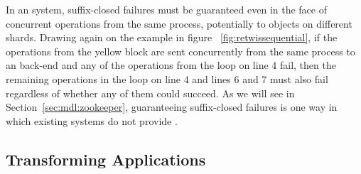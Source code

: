 In an \MDL{} system, suffix-closed failures must be guaranteed even in the
face of concurrent operations from the same process, potentially to
objects on different shards. Drawing again on the example in figure ~\ref{fig:retwissequential}, if the operations from the yellow block are sent concurrently from the same process to an \mdl back-end and any of the operations from the loop on line 4 fail, then the remaining operations in the loop on line 4 and lines 6 and 7 must also fail regardless of whether any of them could succeed.  As we will see in Section~\ref{sec:mdl:zookeeper},
guaranteeing suffix-closed failures is one way in which existing systems do not provide \mdl{}.  


\subsection{Transforming Applications}
\label{sec:mdl:equivalence}

